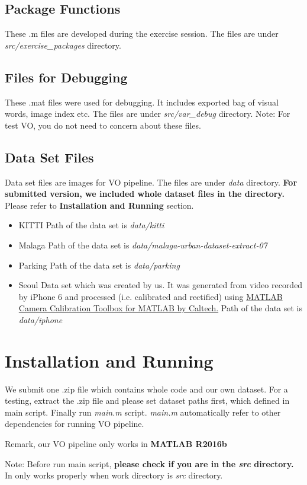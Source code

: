 \subsection*{Package Functions}

These .m files are developed during the exercise session. The files are under \textit{src/exercise\_packages} directory.

\subsection*{Files for Debugging}

These .mat files were used for debugging. It includes exported bag of visual words, image index etc. The files are under \textit{src/var\_debug} directory. \newline 
Note: For test VO, you do not need to concern about these files.

\subsection*{Data Set Files}

Data set files are images for VO pipeline. The files are under \textit{data} directory. \textbf{For submitted version, we included whole dataset files in the directory.} Please refer to \textbf{Installation and Running} section.

\begin{itemize}
\item KITTI \quad Path of the data set is \textit{data/kitti}  
\item Malaga \quad Path of the data set is \textit{data/malaga-urban-dataset-extract-07} 
\item Parking \quad Path of the data set is \textit{data/parking} 
\item Seoul \quad Data set which was created by us. It was generated from video recorded by iPhone 6 and processed (i.e. calibrated and rectified) using \href{https://www.vision.caltech.edu/bouguetj/calib_doc/}{MATLAB Camera Calibration Toolbox for MATLAB by Caltech.} Path of the data set is \textit{data/iphone} 
\end{itemize}



\section{Installation and Running}

We submit one .zip file which contains whole code and our own dataset. For a testing, extract the .zip file and please set dataset paths first, which defined in main script. Finally run \textit{main.m} script. \textit{main.m} automatically refer to other dependencies for running VO pipeline. 

Remark, our VO pipeline only works in \textbf{MATLAB R2016b} 

Note: Before run main script, \textbf{please check if you are in the \textit{src} directory.} In only works properly when work directory is \textit{src} directory. 

